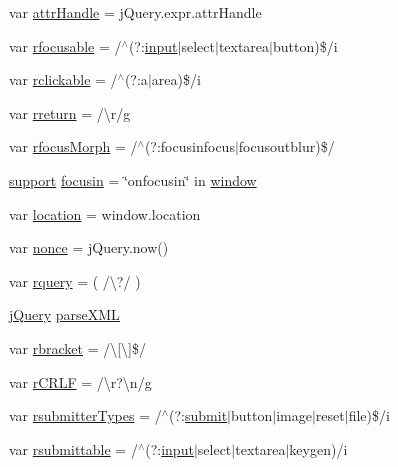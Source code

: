 \begin{DoxyCompactItemize}
\item 
var \hyperlink{jquery-3_82_81_8js_abedf49e04e7bca6a84f4d9f695ab0508}{attr\+Handle} = j\+Query.\+expr.\+attr\+Handle
\item 
var \hyperlink{jquery-3_82_81_8js_aab28558121608d235bdedacb5809bcb9}{rfocusable} = /$^\wedge$(?\+:\hyperlink{jquery-3_82_81_8js_a877535c3b6ffdf230bce90c82c597d17}{input}$\vert$select$\vert$textarea$\vert$button)\$/i
\item 
var \hyperlink{jquery-3_82_81_8js_ab5ccb9d9ea5416aef2ddc3e4d5ba752a}{rclickable} = /$^\wedge$(?\+:a$\vert$area)\$/i
\item 
var \hyperlink{jquery-3_82_81_8js_a2b9eea29f18e1d3891628418507bd9bf}{rreturn} = /\textbackslash{}r/g
\item 
var \hyperlink{jquery-3_82_81_8js_a315b370e4b940df20b4b4299c89c064e}{rfocus\+Morph} = /$^\wedge$(?\+:focusinfocus$\vert$focusoutblur)\$/
\item 
\hyperlink{jquery-3_82_81_8js_ab166c89ccabddfd7c423a7fcb23ca84f}{support} \hyperlink{jquery-3_82_81_8js_a0965ca3ee659f6c0208bd36c34acc95b}{focusin} = \char`\"{}onfocusin\char`\"{} in \hyperlink{jquery-3_82_81_8js_ad55530ae1e5978df8e721017c1fc8466}{window}
\item 
var \hyperlink{jquery-3_82_81_8js_a761c752fb16f7c0bfe1026b787ca0032}{location} = window.\+location
\item 
var \hyperlink{jquery-3_82_81_8js_a5c801ed9bd1324b3aa71a1e1d58f2df9}{nonce} = j\+Query.\+now()
\item 
var \hyperlink{jquery-3_82_81_8js_a2703be63c6fa8b050aa8381bf97513c6}{rquery} = ( /\textbackslash{}?/ )
\item 
\hyperlink{jquery-3_82_81_8js_a609525712f1102566c2b03866ceb2bba}{j\+Query} \hyperlink{jquery-3_82_81_8js_ab58e01f0a789f6062d3b05417f56140e}{parse\+X\+ML}
\item 
var \hyperlink{jquery-3_82_81_8js_a07117e28ee58d2d2664cfbaf741e10c1}{rbracket} = /\textbackslash{}\mbox{[}\textbackslash{}\mbox{]}\$/
\item 
var \hyperlink{jquery-3_82_81_8js_a4fd9dfc4eb645b441a3e84730c50154b}{r\+C\+R\+LF} = /\textbackslash{}r?\textbackslash{}n/g
\item 
var \hyperlink{jquery-3_82_81_8js_a0e9cd4ca08945afe827846f34a36c74a}{rsubmitter\+Types} = /$^\wedge$(?\+:\hyperlink{main_8js_ae57ec6065f5183692e6d6229b7b41b4e}{submit}$\vert$button$\vert$image$\vert$reset$\vert$file)\$/i
\item 
var \hyperlink{jquery-3_82_81_8js_a12d248d7e6c5985c5ea21f56fbef9e90}{rsubmittable} = /$^\wedge$(?\+:\hyperlink{jquery-3_82_81_8js_a877535c3b6ffdf230bce90c82c597d17}{input}$\vert$select$\vert$textarea$\vert$keygen)/i

\end{DoxyCompactItemize}
